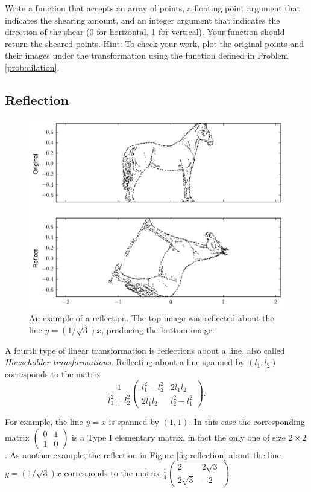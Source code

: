 \begin{problem}[Optional]
Write a function that accepts an array of points, a floating point argument that indicates the shearing amount, and an integer argument
that indicates the direction of the shear (0 for horizontal, 1 for vertical). Your function should return the sheared points. Hint: To check your work, plot the original points and their images under the transformation using the function  defined in Problem \ref{prob:dilation}.
\end{problem}

\subsection*{Reflection}

\begin{figure}
\includegraphics[width=\textwidth]{reflect.pdf}
\caption{An example of a reflection. The top image was reflected about the line $y = (1/\sqrt{3})x$, producing the bottom image.}
\label{fig:reflect}
\end{figure}
A fourth type of linear transformation is reflections about a line, also called \emph{Householder transformations}. Reflecting about a line spanned by $(l_1, l_2)$ corresponds to the matrix
\[
\frac{1}{l_1^2 + l_2^2}
\begin{pmatrix}
l_1^2 - l_2^2 & 2l_1l_2 \\
2l_1l_2 & l_2^2 - l_1^2
\end{pmatrix}.
\]

For example, the line $y=x$ is spanned by $(1, 1)$. In this case the corresponding matrix $\begin{pmatrix}
0 & 1\\
1 & 0
\end{pmatrix}$ is a Type I elementary matrix, in fact the only one of size $2 \times 2$. As another example, the reflection in Figure \ref{fig:reflection} about the line $y = (1/\sqrt{3})x$ corresponds to the matrix $\frac{1}{4}\begin{pmatrix}
2 & 2\sqrt{3}\\
2\sqrt{3} & -2
\end{pmatrix}$.

